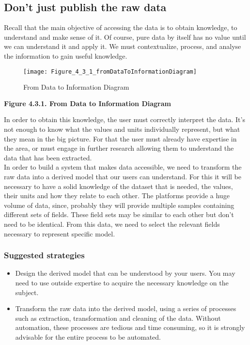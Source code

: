 \subsection{Don't just publish the raw data}

Recall that the main objective of accessing the data is to obtain knowledge, to understand and make sense of it.
Of course, pure data by itself has no value until we can understand it and apply it.
We must contextualize, process, and analyse the information to gain useful knowledge. \\ 
    
\begin{figure}[ht]
    \centering
    \texttt{[image: Figure\_4\_3\_1\_fromDataToInformationDiagram]}
    \caption{From Data to Information Diagram}
 \end{figure}
 
\begin{center}
    \bf{        
    Figure 4.3.1. From Data to Information Diagram}
\end{center}
 
In order to obtain this knowledge, the user must correctly interpret the data.
It's not enough to know what the values and units individually represent, but what they mean in the big picture.
For that the user must already have expertise in the area, or must engage in further research allowing them to understand the data that has been extracted.\\
    
In order to build a system that makes data accessible, we need to transform the raw data into a derived model that our users can understand.
For this it will be necessary to have a solid knowledge of the dataset that is needed, the values, their units and how they relate to each other.
The platforms provide a huge volume of data, since, probably they will provide multiple samples containing different sets of fields. 
These field sets may be similar to each other but don't need to be identical.
From this data, we need to select the relevant fields necessary to represent specific model.\\

\subsubsection*{Suggested strategies} 

\begin{itemize}
    \item Design the derived model that can be understood by your users. You may need to use outside expertise to acquire the necessary knowledge on the subject.

    \item Transform the raw data into the derived model, using a series of processes such as extraction, transformation and cleaning of the data.
        Without automation, these processes are tedious and time consuming, so it is strongly advisable for the entire process to be automated.
\end{itemize}

